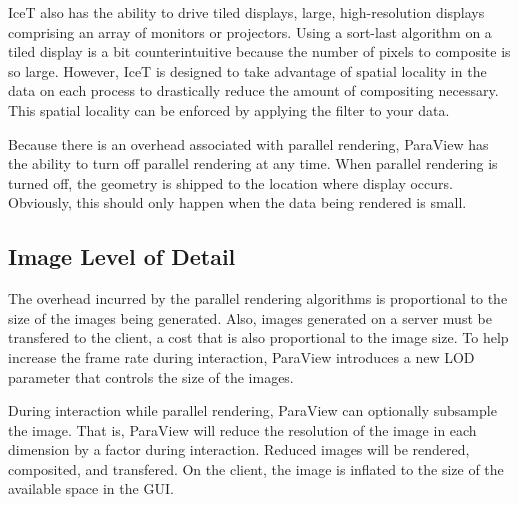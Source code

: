 IceT also has the ability to drive tiled displays, large, high-resolution
displays comprising an array of monitors or projectors.  Using a sort-last
algorithm on a tiled display is a bit counterintuitive because the number
of pixels to composite is so large.  However, IceT is designed to take
advantage of spatial locality in the data on each process to drastically
reduce the amount of compositing necessary.  This spatial locality can be
enforced by applying the  filter to your data.

Because there is an overhead associated with parallel rendering, ParaView
has the ability to turn off parallel rendering at any time.  When parallel
rendering is turned off, the geometry is shipped to the location where
display occurs.  Obviously, this should only happen when the data being
rendered is small.

\subsection{Image Level of Detail}

The overhead incurred by the parallel rendering algorithms is proportional
to the size of the images being generated.  Also, images generated on a
server must be transfered to the client, a cost that is also proportional
to the image size.  To help increase the frame rate during interaction,
ParaView introduces a new LOD parameter that controls the size of the
images.

During interaction while parallel rendering, ParaView can optionally
subsample the image.  That is, ParaView will reduce the
resolution of the image in each dimension by a factor during interaction.
Reduced images will be rendered, composited, and transfered.  On the
client, the image is inflated to the size of the available space in the
GUI.

